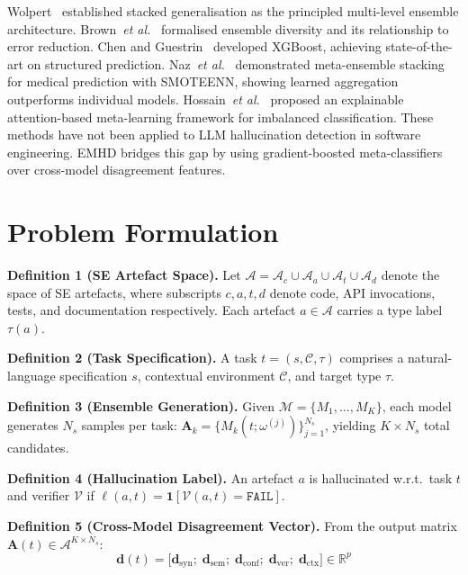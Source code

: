 \documentclass[runningheads]{llncs}
\newcommand{\method}{\textsc{EMHD}}
\newcommand{\etal}{\textit{et al.}}
\begin{document}
Wolpert~\cite{wolpert1992stacking} established stacked generalisation as the principled multi-level ensemble architecture. Brown~\etal~\cite{brown2005diversity} formalised ensemble diversity and its relationship to error reduction. Chen and Guestrin~\cite{chen2016xgboost} developed XGBoost, achieving state-of-the-art on structured prediction. Naz~\etal~\cite{naz2025metaensemble} demonstrated meta-ensemble stacking for medical prediction with SMOTEENN, showing learned aggregation outperforms individual models. Hossain~\etal~\cite{hossain2025attention} proposed an explainable attention-based meta-learning framework for imbalanced classification. These methods have not been applied to LLM hallucination detection in software engineering. \method{} bridges this gap by using gradient-boosted meta-classifiers over cross-model disagreement features.


\section{Problem Formulation}
\label{sec:formulation}

\noindent\textbf{Definition 1 (SE Artefact Space).} Let $\mathcal{A} = \mathcal{A}_c \cup \mathcal{A}_a \cup \mathcal{A}_t \cup \mathcal{A}_d$ denote the space of SE artefacts, where subscripts $c, a, t, d$ denote code, API invocations, tests, and documentation respectively. Each artefact $a \in \mathcal{A}$ carries a type label $\tau(a)$.

\noindent\textbf{Definition 2 (Task Specification).} A task $t = (s, \mathcal{C}, \tau)$ comprises a natural-language specification $s$, contextual environment $\mathcal{C}$, and target type $\tau$.

\noindent\textbf{Definition 3 (Ensemble Generation).} Given $\mathcal{M} = \{M_1, \ldots, M_K\}$, each model generates $N_s$ samples per task: $\mathbf{A}_k = \{M_k(t; \omega^{(j)})\}_{j=1}^{N_s}$, yielding $K \times N_s$ total candidates.

\noindent\textbf{Definition 4 (Hallucination Label).} An artefact $a$ is hallucinated w.r.t.\ task $t$ and verifier $\mathcal{V}$ if $\ell(a,t) = \mathbf{1}[\mathcal{V}(a,t) = \texttt{FAIL}]$.

\noindent\textbf{Definition 5 (Cross-Model Disagreement Vector).} From the output matrix $\mathbf{A}(t) \in \mathcal{A}^{K \times N_s}$:
\begin{equation}
\mathbf{d}(t) = \bigl[\mathbf{d}_{\mathrm{syn}};\; \mathbf{d}_{\mathrm{sem}};\; \mathbf{d}_{\mathrm{conf}};\; \mathbf{d}_{\mathrm{ver}};\; \mathbf{d}_{\mathrm{ctx}}\bigr] \in \mathbb{R}^{p}
\label{eq:feature_vector}
\end{equation}
\end{document}
